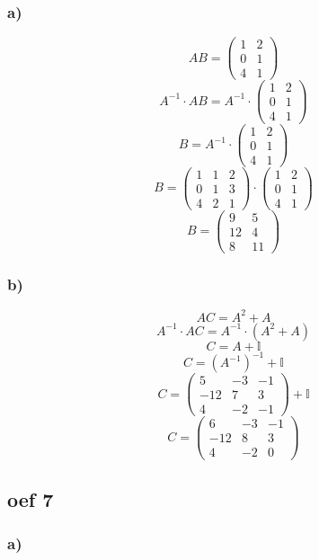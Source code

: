\documentclass[lineaire_algebra_oplossingen.tex]{subfiles}
\begin{document}
\subsubsection*{a)}
$$ AB =
\begin{pmatrix}
1 & 2 \\
0 & 1 \\
4 & 1
\end{pmatrix}
$$
$$ A^{-1} \cdot AB = A^{-1} \cdot 
\begin{pmatrix}
1 & 2 \\
0 & 1 \\
4 & 1
\end{pmatrix}
$$
$$ B = A^{-1} \cdot
\begin{pmatrix}
1 & 2 \\
0 & 1 \\
4 & 1
\end{pmatrix}
$$
$$ B = 
\begin{pmatrix}
1 & 1 & 2 \\
0 & 1 & 3 \\
4 & 2 & 1
\end{pmatrix}
\cdot
\begin{pmatrix}
1 & 2 \\
0 & 1 \\
4 & 1
\end{pmatrix}
$$
$$ B = 
\begin{pmatrix}
9 & 5 \\
12 & 4 \\
8 & 11
\end{pmatrix}
$$
\subsubsection*{b)}
$$ AC = A^2 + A$$
$$ A^{-1} \cdot AC = A^{-1} \cdot (A^2 + A)$$
$$ C = A + \mathbb{I} $$
$$ C = (A^{-1})^{-1} + \mathbb{I} $$
$$ C = 
\begin{pmatrix}
5 & -3 & -1 \\
-12 & 7 & 3 \\
4 & -2 & -1
\end{pmatrix}
+ \mathbb{I} $$
$$ C = 
\begin{pmatrix}
6 & -3 & -1 \\
-12 & 8 & 3 \\
4 & -2 & 0
\end{pmatrix}
$$
\subsection{oef 7}
\subsubsection*{a)}
\end{document}
